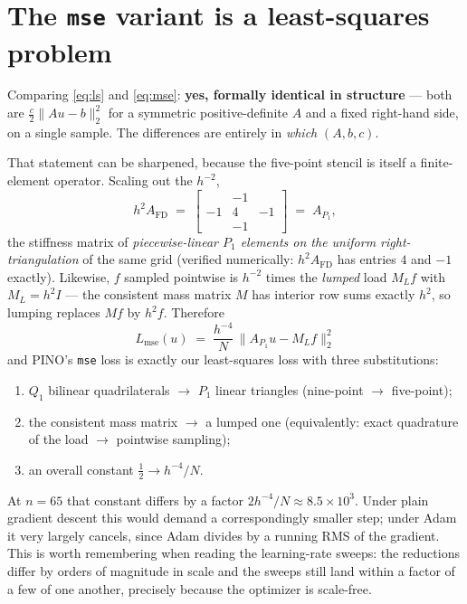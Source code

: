 \documentclass[11pt]{article}
\newcommand{\Afd}{A_{\mathrm{FD}}}
\begin{document}
\section{The \texttt{mse} variant is a least-squares problem}

Comparing \eqref{eq:ls} and \eqref{eq:mse}: \textbf{yes, formally identical in structure} ---
both are $\tfrac{c}{2}\|Au-b\|_2^2$ for a symmetric positive-definite $A$ and a fixed right-hand
side, on a single sample. The differences are entirely in \emph{which} $(A,b,c)$.

That statement can be sharpened, because the five-point stencil is itself a finite-element
operator. Scaling out the $h^{-2}$,
\begin{equation}
  h^2 \Afd \;=\;
  \begin{bmatrix} & -1 & \\ -1 & 4 & -1 \\ & -1 & \end{bmatrix}
  \;=\; A_{P_1},
\end{equation}
the stiffness matrix of \emph{piecewise-linear $P_1$ elements on the uniform right-triangulation}
of the same grid (verified numerically: $h^2\Afd$ has entries $4$ and $-1$ exactly). Likewise,
$f$ sampled pointwise is $h^{-2}$ times the \emph{lumped} load $M_L f$ with $M_L = h^2 I$ ---
the consistent mass matrix $M$ has interior row sums exactly $h^2$, so lumping replaces $Mf$ by
$h^2 f$. Therefore
\begin{equation}
  \boxed{\;
  L_{\mathrm{mse}}(u) \;=\; \frac{h^{-4}}{N}\,\bigl\| A_{P_1} u - M_L f \bigr\|_2^2 \;}
  \label{eq:identification}
\end{equation}
and PINO's \texttt{mse} loss is exactly our least-squares loss with three substitutions:
\begin{enumerate}
  \item $Q_1$ bilinear quadrilaterals $\to$ $P_1$ linear triangles (nine-point $\to$ five-point);
  \item the consistent mass matrix $\to$ a lumped one (equivalently: exact quadrature of the load
        $\to$ pointwise sampling);
  \item an overall constant $\tfrac12 \to h^{-4}/N$.
\end{enumerate}
At $n=65$ that constant differs by a factor $2h^{-4}/N \approx 8.5\times10^{3}$. Under plain
gradient descent this would demand a correspondingly smaller step; under Adam it very largely
cancels, since Adam divides by a running RMS of the gradient. This is worth remembering when
reading the learning-rate sweeps: the reductions differ by orders of magnitude in scale and the
sweeps still land within a factor of a few of one another, precisely because the optimizer is
scale-free.
\end{document}

